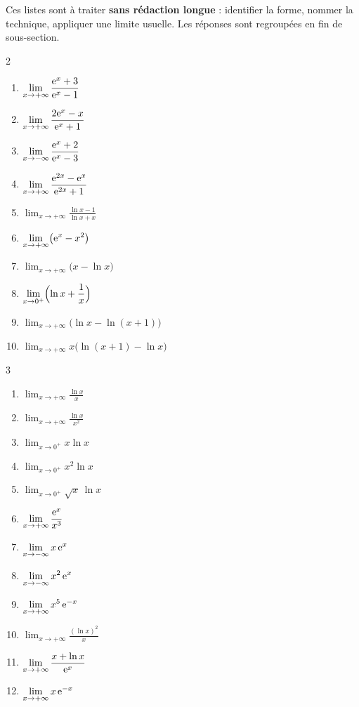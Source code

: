 \begin{astucebac}
	Ces listes sont à traiter \textbf{sans rédaction longue} : identifier la
	forme, nommer la technique, appliquer une limite usuelle. Les réponses sont
	regroupées en fin de sous-section.
\end{astucebac}

\begin{multicols}{2}
\begin{enumerate}
	\item $\displaystyle\lim_{x\to+\infty}\frac{\mathrm{e}^x+3}{\mathrm{e}^x-1}$
	\item $\displaystyle\lim_{x\to+\infty}\frac{2\mathrm{e}^x-x}{\mathrm{e}^x+1}$
	\item $\displaystyle\lim_{x\to-\infty}\frac{\mathrm{e}^x+2}{\mathrm{e}^x-3}$
	\item $\displaystyle\lim_{x\to+\infty}\frac{\mathrm{e}^{2x}-\mathrm{e}^x}{\mathrm{e}^{2x}+1}$
	\item $\displaystyle\lim_{x\to+\infty}\frac{\ln x-1}{\ln x+x}$
	\item $\displaystyle\lim_{x\to+\infty}\bigl(\mathrm{e}^x-x^2\bigr)$
	\item $\displaystyle\lim_{x\to+\infty}\bigl(x-\ln x\bigr)$
	\item $\displaystyle\lim_{x\to 0^+}\Bigl(\ln x+\frac{1}{x}\Bigr)$
	\item $\displaystyle\lim_{x\to+\infty}\bigl(\ln x-\ln(x+1)\bigr)$
	\item $\displaystyle\lim_{x\to+\infty}x\bigl(\ln(x+1)-\ln x\bigr)$
\end{enumerate}
\end{multicols}

\begin{multicols}{3}
\begin{enumerate}
	\item $\displaystyle\lim_{x\to+\infty}\frac{\ln x}{x}$
	\item $\displaystyle\lim_{x\to+\infty}\frac{\ln x}{x^2}$
	\item $\displaystyle\lim_{x\to 0^+}x\ln x$
	\item $\displaystyle\lim_{x\to 0^+}x^2\ln x$
	\item $\displaystyle\lim_{x\to 0^+}\sqrt{x}\,\ln x$
	\item $\displaystyle\lim_{x\to+\infty}\frac{\mathrm{e}^x}{x^3}$
	\item $\displaystyle\lim_{x\to-\infty}x\,\mathrm{e}^x$
	\item $\displaystyle\lim_{x\to-\infty}x^2\,\mathrm{e}^x$
	\item $\displaystyle\lim_{x\to+\infty}x^5\,\mathrm{e}^{-x}$
	\item $\displaystyle\lim_{x\to+\infty}\frac{(\ln x)^2}{x}$
	\item $\displaystyle\lim_{x\to+\infty}\frac{x+\ln x}{\mathrm{e}^x}$
	\item $\displaystyle\lim_{x\to+\infty}x\,\mathrm{e}^{-x}$
\end{enumerate}
\end{multicols}

